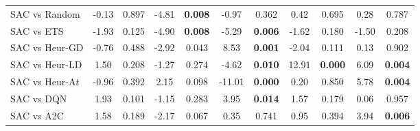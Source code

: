 \begin{tabular}{lcccccccccc}
	\midrule 
	SAC vs Random    & -0.13         & 0.897                  & -4.81         & \textbf{0.008}         & -0.97          & 0.362                 & 0.42           & 0.695                 & 0.28           & 0.787                 \\
	SAC vs ETS       & -1.93         & 0.125                  & -4.90         & \textbf{0.008}         & -5.29          & \textbf{0.006}        & -1.62          & 0.180                 & -1.50          & 0.208                 \\
	SAC vs Heur-GD   & -0.76         & 0.488                  & -2.92         & 0.043                  & 8.53           & \textbf{0.001}        & -2.04          & 0.111                 & 0.13           & 0.902                 \\
	SAC vs Heur-LD   & 1.50          & 0.208                  & -1.27         & 0.274                  & -4.62          & \textbf{0.010}        & 12.91          & \textbf{0.000}        & 6.09           & \textbf{0.004}        \\
	SAC vs Heur-A$t$  & -0.96         & 0.392                  & 2.15          & 0.098                  & -11.01         & \textbf{0.000}        & 0.20           & 0.850                 & 5.78           & \textbf{0.004}        \\
	SAC vs DQN       & 1.93          & 0.101                  & -1.15         & 0.283                  & 3.95           & \textbf{0.014}        & 1.57           & 0.179                 & 0.06           & 0.957                 \\
	SAC vs A2C       & 1.58          & 0.189                  & -2.17         & 0.067                  & 0.35           & 0.741                 & 0.95           & 0.394                 & 3.94           & \textbf{0.006}       \\
	\bottomrule 
\end{tabular}
